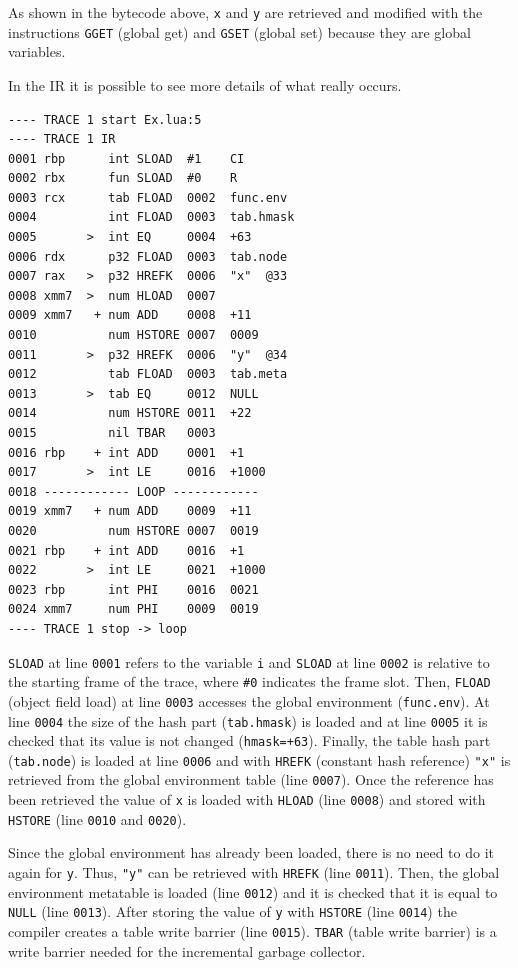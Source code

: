 \noindent
As shown in the bytecode above, \texttt{x} and \texttt{y} are retrieved and modified with the instructions \texttt{GGET} (global get) and \texttt{GSET} (global set) because they are global variables.

In the IR it is possible to see more details of what really occurs.

\begin{multicols}{2}
\begin{lstlisting}[style=DumpStyle]
---- TRACE 1 start Ex.lua:5
---- TRACE 1 IR
0001 rbp      int SLOAD  #1    CI
0002 rbx      fun SLOAD  #0    R
0003 rcx      tab FLOAD  0002  func.env
0004          int FLOAD  0003  tab.hmask
0005       >  int EQ     0004  +63 
0006 rdx      p32 FLOAD  0003  tab.node
0007 rax   >  p32 HREFK  0006  "x"  @33
0008 xmm7  >  num HLOAD  0007
0009 xmm7   + num ADD    0008  +11 
0010          num HSTORE 0007  0009
0011       >  p32 HREFK  0006  "y"  @34
0012          tab FLOAD  0003  tab.meta
0013       >  tab EQ     0012  NULL
0014          num HSTORE 0011  +22 
0015          nil TBAR   0003
0016 rbp    + int ADD    0001  +1  
0017       >  int LE     0016  +1000
0018 ------------ LOOP ------------
0019 xmm7   + num ADD    0009  +11 
0020          num HSTORE 0007  0019
0021 rbp    + int ADD    0016  +1  
0022       >  int LE     0021  +1000
0023 rbp      int PHI    0016  0021
0024 xmm7     num PHI    0009  0019
---- TRACE 1 stop -> loop
\end{lstlisting}
\end{multicols}

\noindent
\texttt{SLOAD} at line \texttt{0001} refers to the variable \texttt{i} and \texttt{SLOAD} at line \texttt{0002} is relative to the starting frame of the trace, where \texttt{\#0} indicates the frame slot. Then, \texttt{FLOAD} (object field load) at line \texttt{0003} accesses the global environment (\texttt{func.env}). At line \texttt{0004} the size of the hash part (\texttt{tab.hmask}) is loaded and at line \texttt{0005} it is checked that its value is not changed (\texttt{hmask=+63}). Finally, the table hash part (\texttt{tab.node}) is loaded  at line \texttt{0006} and with \texttt{HREFK} (constant hash reference) \texttt{"x"} is retrieved from the global environment table (line \texttt{0007}). Once the reference has been retrieved the value of \texttt{x} is loaded with \texttt{HLOAD} (line \texttt{0008}) and stored with \texttt{HSTORE} (line \texttt{0010} and \texttt{0020}).

Since the global environment has already been loaded, there is no need to do it again for \texttt{y}. Thus, \texttt{"y"} can be retrieved with \texttt{HREFK} (line \texttt{0011}). Then, the global environment metatable is loaded (line \texttt{0012}) and it is checked that it is equal to \texttt{NULL} (line \texttt{0013}). After storing the value of \texttt{y} with \texttt{HSTORE} (line \texttt{0014}) the compiler creates a table write barrier (line \texttt{0015}). \texttt{TBAR} (table write barrier) is a write barrier needed for the incremental garbage collector.

